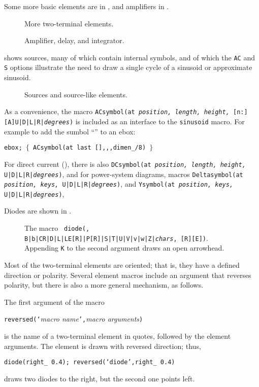 Some more basic elements are in , and amplifiers in .
\begin{figure}[h!t]
   
   \caption{More two-terminal elements.}
   \label{MoreTable}
    \end{figure}
\begin{figure}[h!t]
\vspace*{-\baselineskip}
   
   \caption{Amplifier, delay, and integrator.}
   \label{AmpTable}
   \end{figure}

 shows sources, many of which contain internal symbols,
and of which the {\tt AC} and {\tt S} options illustrate the need
to draw a single cycle of a sinusoid or approximate sinusoid.
\begin{figure}[h!t]
   
   \caption{Sources and source-like elements.}
   \label{Sources}
   \end{figure}
As a convenience,
the macro {\tt ACsymbol(at {\sl position, length, height,}
  [n:][A]U|D|L|R|{\sl degrees})} is included as an interface to
the {\tt sinusoid} macro.  For example to add the sumbol
``'' to an ebox:
\par
{\tt ebox; $\lbrace$\ ACsymbol(at last [],{,},dimen\_/8) $\rbrace$}

\noindent
For direct current (), there is also
{\tt DCsymbol(at {\sl position, length, height,} U|D|L|R|{\sl degrees})},
and for power-system diagrams, macros
{\tt Deltasymbol(at {\sl position, keys,} U|D|L|R|{\sl degrees})},
and
{\tt Ysymbol(at {\sl position, keys,} U|D|L|R|{\sl degrees})},

Diodes are shown in .
\begin{figure}[h!t]
   
   \caption{The macro {\tt
     diode(\linespec, B|b|CR|D|L|LE[R]|P[R]|S|T|U|V|v|w|Z|{\sl chars}, [R][E])}.
      Appending {\tt K} to the second argument draws an open arrowhead.}
   \label{Diodes}
   \end{figure}

Most of the two-terminal elements are oriented; that is, they have
a defined direction or polarity.  Several element macros include an
argument that reverses polarity, but there is also a more general
mechanism, as follows.

The first argument of the macro
\par
{\tt reversed(`}{\sl macro name}{\tt',}{\sl macro arguments}{\tt )}
\par
\noindent
is the name of a two-terminal element in quotes, followed by the
element arguments.  The element is drawn with reversed direction; thus,
\par
{\tt diode(right\_ 0.4); reversed(`diode',right\_ 0.4)}
\par
\noindent
draws two diodes to the right, but the second one points left.

